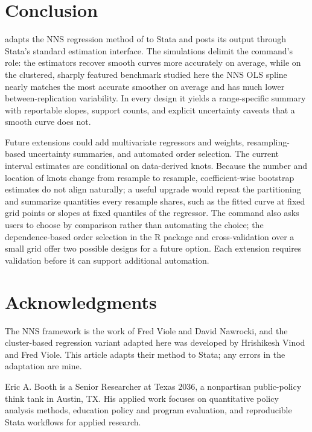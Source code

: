 \documentclass[bib]{statapress}
\begin{document}
\section{Conclusion}
\label{sec:conclusion}

 adapts the NNS regression method of
\citet{viole_nawrocki_2013} to Stata and posts its output through Stata's
standard estimation interface.  The
simulations delimit the command's role: the  estimators
recover smooth curves more accurately on average, while on the clustered,
sharply featured benchmark studied here the NNS OLS spline nearly matches the
most accurate smoother on average and has much lower between-replication
variability.  In every design it yields a range-specific summary with
reportable slopes, support counts, and explicit uncertainty caveats that a
smooth curve does not.

Future extensions could add multivariate regressors and weights,
resampling-based uncertainty summaries, and automated order selection.  The
current interval estimates are conditional on data-derived knots.  Because
the number and location of knots change from resample to resample,
coefficient-wise bootstrap estimates do not align naturally; a useful upgrade
would repeat the partitioning and summarize quantities every resample shares,
such as the fitted curve at fixed grid points or slopes at fixed quantiles of
the regressor.  The command also asks users to choose
 by comparison rather than automating the choice; the
dependence-based order selection in the R package \citep{viole_2026_nns} and
cross-validation over a small  grid offer two possible designs for
a future  option.  Each extension requires validation
before it can support additional automation.

\section{Acknowledgments}

The NNS framework is the work of Fred Viole and David Nawrocki, and the
cluster-based regression variant adapted here was developed by Hrishikesh
Vinod and Fred Viole.  This article adapts their method to Stata; any errors
in the adaptation are mine.




\begin{aboutauthor}
Eric A. Booth is a Senior Researcher at Texas 2036, a nonpartisan
public-policy think tank in Austin, TX.  His applied work focuses on
quantitative policy analysis methods, education policy and program evaluation,
and reproducible Stata workflows for applied research.
\end{aboutauthor}

\clearpage
\end{document}
